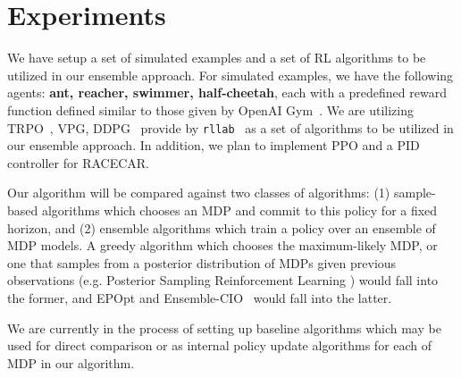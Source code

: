 \documentclass{article}
\begin{document}

\section{Experiments}

We have setup a set of simulated examples and a set of RL algorithms to be utilized in our ensemble approach. For simulated examples, we have the following agents: \textbf{ant, reacher, swimmer, half-cheetah}, each with a predefined reward function defined similar to those given by OpenAI Gym~\cite{openai}. We are utilizing TRPO~\cite{trpo}, VPG, DDPG~\cite{ddpg} provide by \texttt{rllab}~\cite{duan2016benchmarking} as a set of algorithms to be utilized in our ensemble approach. In addition, we plan to implement PPO and a PID controller for RACECAR.

Our algorithm will be compared against two classes of algorithms: (1) sample-based algorithms which chooses an MDP and commit to this policy for a fixed horizon, and (2) ensemble algorithms which train a policy over an ensemble of MDP models. A greedy algorithm which chooses the maximum-likely MDP, or one that samples from a posterior distribution of MDPs given previous observations (e.g. Posterior Sampling Reinforcement Learning \cite{psrl}) would fall into the former, and EPOpt\cite{rajeswaran2016epopt} and Ensemble-CIO~\cite{ensemble-cio} would fall into the latter.

We are currently in the process of setting up baseline algorithms which may be used for direct comparison or as internal policy update algorithms for each of MDP in our algorithm.
\end{document}
